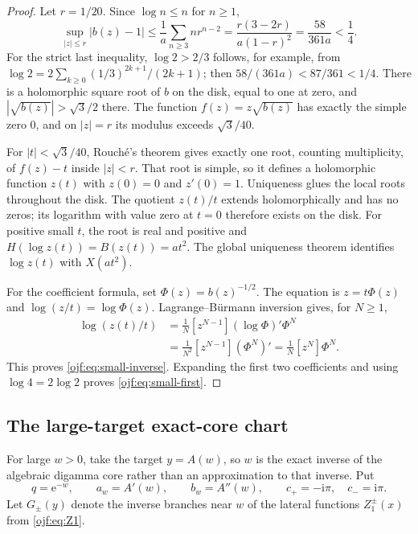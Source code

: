\documentclass[11pt,a4paper]{article}
\numberwithin{equation}{section}
\theoremstyle{definition}\newtheorem{definition}[theorem]{Definition}
\theoremstyle{remark}\newtheorem{remark}[theorem]{Remark}
\newcommand{\ee}{\mathrm e}\newcommand{\ii}{\mathrm i}\newcommand{\dd}{\,\mathrm d}
\newcommand{\coef}[2]{[#1^{#2}]}
\begin{document}
\begin{proof}
Let $r=1/20$. Since $\log n\le n$ for $n\ge1$,
\[
 \sup_{|z|\le r}|b(z)-1|
 \le\frac1a\sum_{n\ge3}n r^{n-2}
 =\frac{r(3-2r)}{a(1-r)^2}
 =\frac{58}{361a}<\frac14.
\]
For the strict last inequality, $\log2>2/3$ follows, for example, from
$\log2=2\sum_{k\ge0}(1/3)^{2k+1}/(2k+1)$; then
$58/(361a)<87/361<1/4$.
There is a holomorphic square root of $b$ on the disk, equal to one
at zero, and $|\sqrt{b(z)}|>\sqrt3/2$ there. The function
$f(z)=z\sqrt{b(z)}$ has exactly the simple zero $0$, and on $|z|=r$
its modulus exceeds $\sqrt3/40$.

For $|t|<\sqrt3/40$, Rouch\'e's theorem gives exactly one root,
counting multiplicity, of $f(z)-t$ inside $|z|<r$. That root is simple,
so it defines a holomorphic function $z(t)$ with $z(0)=0$ and
$z'(0)=1$. Uniqueness glues the local roots throughout the disk.
The quotient $z(t)/t$ extends holomorphically and has no zeros;
its logarithm with value zero at $t=0$ therefore exists on the disk.
For positive small $t$, the root is real and positive and
$H(\log z(t))=B(z(t))=at^2$. The global uniqueness theorem identifies
$\log z(t)$ with $X(at^2)$.

For the coefficient formula, set $\Phi(z)=b(z)^{-1/2}$. The equation
is $z=t\Phi(z)$ and $\log(z/t)=\log\Phi(z)$.
Lagrange--B\"urmann inversion gives, for $N\ge1$,
\begin{align*}
 \coef{t}{N}\log(z(t)/t)
 &=\frac1N\coef{z}{N-1}(\log\Phi)'\Phi^N\\
 &=\frac1{N^2}\coef{z}{N-1}(\Phi^N)'
  =\frac1N\coef{z}{N}\Phi^N.
\end{align*}
This proves \eqref{ojf:eq:small-inverse}. Expanding the first two
coefficients and using $\log4=2\log2$ proves
\eqref{ojf:eq:small-first}.
\end{proof}

\subsection{The large-target exact-core chart}
For large $w>0$, take the target $y=A(w)$, so $w$ is the exact
inverse of the algebraic digamma core rather than an approximation to
that inverse. Put
\begin{equation}\label{ojf:eq:large-notations}
 q=\ee^{-w},\qquad a_w=A'(w),\qquad b_w=A''(w),\qquad
 c_+=-\ii\pi,\quad c_-=\ii\pi.
\end{equation}
Let $G_\pm(y)$ denote the inverse branches near $w$ of the lateral
functions $Z_1^\pm(x)$ from \eqref{ojf:eq:Z1}.
\end{document}
